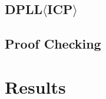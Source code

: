 \documentclass[envcountsect]{llncs}
\begin{document}
\subsection{DPLL$\langle$ICP$\rangle$}

\subsection{Proof Checking}

\section{Results}






\end{document}
